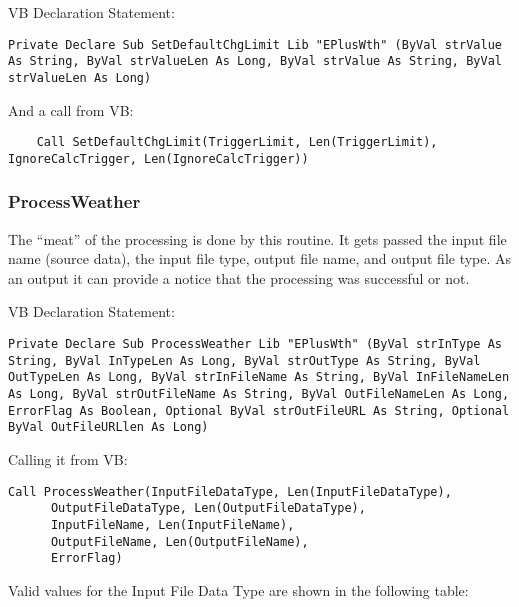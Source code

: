 VB Declaration Statement:

\begin{lstlisting}
Private Declare Sub SetDefaultChgLimit Lib "EPlusWth" (ByVal strValue As String, ByVal strValueLen As Long, ByVal strValue As String, ByVal strValueLen As Long)
\end{lstlisting}

And a call from VB:

\begin{lstlisting}
    Call SetDefaultChgLimit(TriggerLimit, Len(TriggerLimit), IgnoreCalcTrigger, Len(IgnoreCalcTrigger))
\end{lstlisting}

\subsubsection{ProcessWeather}\label{processweather}

The ``meat'' of the processing is done by this routine. It gets passed the input file name (source data), the input file type, output file name, and output file type. As an output it can provide a notice that the processing was successful or not.

VB Declaration Statement:

\begin{lstlisting}
Private Declare Sub ProcessWeather Lib "EPlusWth" (ByVal strInType As String, ByVal InTypeLen As Long, ByVal strOutType As String, ByVal OutTypeLen As Long, ByVal strInFileName As String, ByVal InFileNameLen As Long, ByVal strOutFileName As String, ByVal OutFileNameLen As Long, ErrorFlag As Boolean, Optional ByVal strOutFileURL As String, Optional ByVal OutFileURLlen As Long)
\end{lstlisting}

Calling it from VB:

\begin{lstlisting}
Call ProcessWeather(InputFileDataType, Len(InputFileDataType),
      OutputFileDataType, Len(OutputFileDataType),
      InputFileName, Len(InputFileName),
      OutputFileName, Len(OutputFileName),
      ErrorFlag)
\end{lstlisting}

Valid values for the Input File Data Type are shown in the following table:

